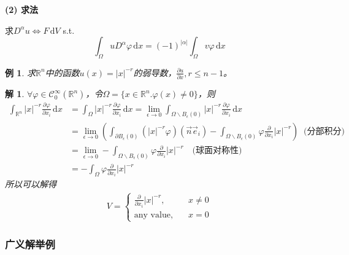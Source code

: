 \documentclass[11pt, a4paper]{article}
\theoremstyle{theorem}
\newtheorem{eg}[thm]{例}
\newtheorem*{slv}{解}
\newcommand{\intd}[1]{\,\mathrm{d}{#1}}
\begin{document}
\textbf{(2) 求法}

求$D^\alpha u \Leftrightarrow F \intd V$ s.t.
$$
\int_\Omega u D^\alpha \varphi \intd x = (-1)^{|\alpha|} \int_\Omega v \varphi \intd x
$$

\begin{eg}
    求$\mathbb{R}^n$中的函数$u(x) = |x|^{- r}$的弱导数，$\frac{\partial u}{\partial x}, r \leq n-1$。
\end{eg}

\begin{slv}
$\forall \varphi \in \mathcal{C}_0^\infty(\mathbb{R}^n)$，令$\Omega = \{x \in \mathbb{R}^n. \varphi(x) \neq 0\}$，则
\begin{align*}
    \int_{\mathbb{R}^n} |x|^{-r} \frac{\partial \varphi}{\partial x_i} \intd x
    &= \int_\Omega |x|^{-r} \frac{\partial \varphi}{\partial x_i} \intd x = \lim\limits_{\epsilon \rightarrow 0} \int_{\Omega \backslash B_\epsilon(0)} |x|^{-r} \frac{\partial \varphi}{\partial x_i} \intd x \\
    &= \lim\limits_{\epsilon \rightarrow 0} \left(\int_{\partial B_\epsilon(0)}\left(|x|^{-r}\varphi \right) (\vec{n} \vec{e}_i)  - \int_{\Omega \backslash B_\epsilon(0)} \varphi \frac{\partial}{\partial x_i} |x|^{-r}  \right) \; \; \text{(分部积分)} \\
    &= \lim\limits_{\epsilon \rightarrow 0} - \int_{\Omega \backslash B_\epsilon(0)} \varphi \frac{\partial}{\partial x_i} |x|^{-r} \quad \text{(球面对称性)} \\
    &= - \int_{\Omega} \varphi \frac{\partial}{\partial x_i} |x|^{-r}
\end{align*}
所以可以解得
\begin{align}
    V = \begin{cases}
    \frac{\partial }{\partial x_i} |x|^{-r}, \quad &x \neq 0 \\
    \text{any value}, \quad & x = 0
    \end{cases}
\end{align}
\end{slv}

\subsubsection{广义解举例}
\end{document}

